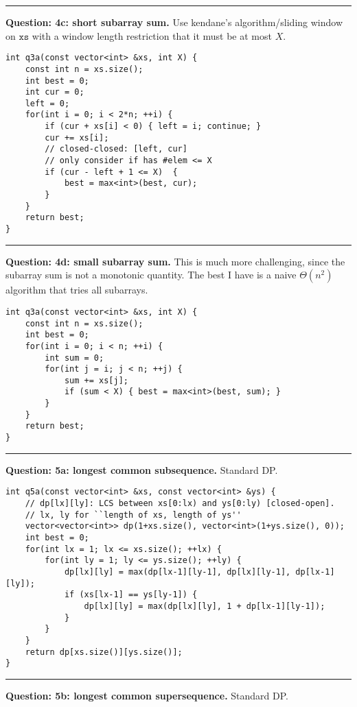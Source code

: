 \documentclass[14pt]{report}
\newcommand*{\question}[1]{\leavevmode\clearpage \par\noindent\rule{\textwidth}{0.4pt} \textbf{Question: #1.}}
\begin{document}
\question{4c: short subarray sum}
Use kendane's algorithm/sliding window on $\texttt{xs}$
with a window length restriction that it must be at most $X$.

\begin{verbatim}
int q3a(const vector<int> &xs, int X) {
    const int n = xs.size();
    int best = 0;
    int cur = 0;
    left = 0;
    for(int i = 0; i < 2*n; ++i) {
        if (cur + xs[i] < 0) { left = i; continue; }
        cur += xs[i];
        // closed-closed: [left, cur]
        // only consider if has #elem <= X
        if (cur - left + 1 <= X)  {
            best = max<int>(best, cur);
        }
    }
    return best;
}
\end{verbatim}


\question{4d: small subarray sum}
This is much more challenging, since the subarray sum is not a
monotonic quantity. The best I have is a naive $\Theta(n^2)$
algorithm that tries all subarrays.

\begin{verbatim}
int q3a(const vector<int> &xs, int X) {
    const int n = xs.size();
    int best = 0;
    for(int i = 0; i < n; ++i) {
        int sum = 0;
        for(int j = i; j < n; ++j) {
            sum += xs[j];
            if (sum < X) { best = max<int>(best, sum); }
        }
    }
    return best;
}
\end{verbatim}

\question{5a: longest common subsequence}
Standard DP.

\begin{verbatim}
int q5a(const vector<int> &xs, const vector<int> &ys) {
    // dp[lx][ly]: LCS between xs[0:lx) and ys[0:ly) [closed-open].
    // lx, ly for ``length of xs, length of ys''
    vector<vector<int>> dp(1+xs.size(), vector<int>(1+ys.size(), 0));
    int best = 0;
    for(int lx = 1; lx <= xs.size(); ++lx) {
        for(int ly = 1; ly <= ys.size(); ++ly) {
            dp[lx][ly] = max(dp[lx-1][ly-1], dp[lx][ly-1], dp[lx-1][ly]);
            if (xs[lx-1] == ys[ly-1]) {
                dp[lx][ly] = max(dp[lx][ly], 1 + dp[lx-1][ly-1]);
            }
        }
    }
    return dp[xs.size()][ys.size()];
}
\end{verbatim}

\question{5b: longest common supersequence}
Standard DP.
\end{document}
